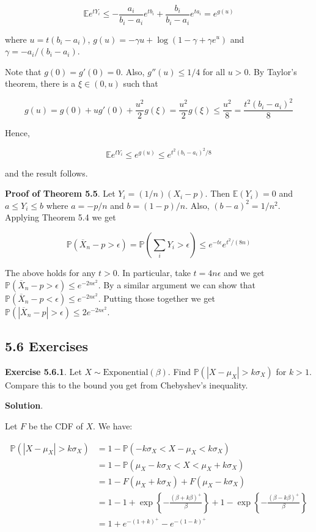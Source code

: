 \[ \mathbb{E}e^{tY_i} \leq - \frac{a_i}{b_i - a_i} e^{tb_i} + \frac{b_i}{b_i - a_i} e^{ta_i} = e^{g(u)} \]

where \(u = t(b_i - a_i)\),
\(g(u) = -\gamma u + \log (1 - \gamma + \gamma e^u)\) and
\(\gamma = -a_i / (b_i - a_i)\).

Note that \(g(0) = g'(0) = 0\). Also, \(g''(u) \leq 1/4\) for all
\(u > 0\). By Taylor's theorem, there is a \(\xi \in (0, u)\) such that

\[ g(u) = g(0) + u g'(0) + \frac{u^2}{2} g(\xi) = \frac{u^2}{2} g(\xi) \leq \frac{u^2}{8} = \frac{t^2(b_i - a_i)^2}{8} \]

Hence,

\[ \mathbb{E}e^{tY_i} \leq e^{g(u)} \leq e^{t^2(b_i - a_i)^2/8} \]

and the result follows.

\textbf{Proof of Theorem 5.5}. Let \(Y_i = (1 / n)(X_i - p)\). Then
\(\mathbb{E}(Y_i) = 0\) and \(a \leq Y_i \leq b\) where \(a = -p/n\) and
\(b = (1 - p) / n\). Also, \((b - a)^2 = 1/n^2\). Applying Theorem 5.4
we get

\[ \mathbb{P}\left(\overline{X}_n - p > \epsilon\right) = \mathbb{P}\left( \sum_i Y_i > \epsilon \right) \leq e^{-t\epsilon} e^{t^2/(8n)}\]

The above holds for any \(t > 0\). In particular, take
\(t = 4n\epsilon\) and we get
\(\mathbb{P}\left(\overline{X}_n - p > \epsilon\right)  \leq e^{-2n\epsilon^2}\).
By a similar argument we can show that
\(\mathbb{P}\left(\overline{X}_n - p < \epsilon\right)  \leq e^{-2n\epsilon^2}\).
Putting those together we get
\(\mathbb{P}\left(|\overline{X}_n - p| >  \epsilon\right)  \leq 2e^{-2n\epsilon^2}\).

\subsection{5.6 Exercises}\label{exercises}

\textbf{Exercise 5.6.1}. Let \(X \sim \text{Exponential}(\beta)\). Find
\(\mathbb{P}(|X - \mu_X| > k \sigma_X)\) for \(k > 1\). Compare this to
the bound you get from Chebyshev's inequality.

\textbf{Solution}.

Let \(F\) be the CDF of \(X\). We have:

\begin{align}
\mathbb{P}(|X - \mu_X| > k \sigma_X) &= 1 - \mathbb{P}(-k \sigma_X < X - \mu_X < k \sigma_X) \\
&= 1 - \mathbb{P}(\mu_X - k \sigma_X < X < \mu_X + k \sigma_X) \\
&= 1 - F(\mu_X + k \sigma_X) + F(\mu_X - k \sigma_X) \\
&= 1 - 1 + \exp\left\{ -\frac{\left(\beta + k \beta\right)^+}{\beta} \right\} + 1 - \exp\left\{-\frac{\left(\beta - k \beta\right)^+}{\beta} \right\} \\
&= 1 + e^{-(1+k)^+ } - e^{-(1-k)^+} 
\end{align}

